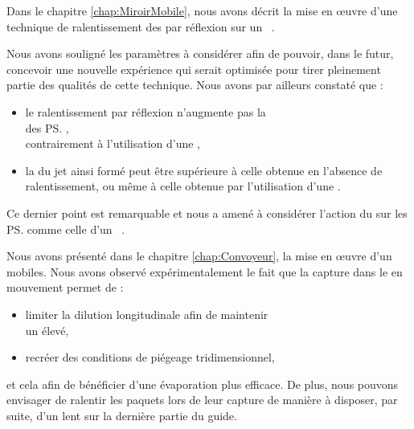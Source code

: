 \vspace{1ex}
\vspace{1ex}

Dans le chapitre \ref{chap:MiroirMobile},
nous avons décrit la mise en \oe uvre d'une technique de ralentissement des \pats par réflexion sur un \mimamo~\cite{RWC06}. 

Nous avons souligné les paramètres à considérer afin de pouvoir, dans le futur,  concevoir une nouvelle expérience qui serait optimisée pour tirer pleinement partie des qualités de cette technique. Nous avons par ailleurs constaté que :
\begin{itemize}
	\item le ralentissement par réflexion n'augmente pas la\\ \dispvitlong des \ps,\\ contrairement à l'utilisation d'une \secpent,
	\item la \ddedpup du jet ainsi formé peut être supérieure à celle obtenue en l'absence de ralentissement, ou même à celle obtenue par l'utilisation d'une \secpent.
\end{itemize}
\noindent
Ce dernier point est remarquable et nous a amené à considérer l'action du \mimo sur les \ps comme celle d'un ~\cite{ReG08}.

\vspace{1ex}
\vspace{1ex}

Nous avons présenté dans le chapitre \ref{chap:Convoyeur}, la mise en \oe uvre d'un \tpIP mobiles. 
Nous avons observé expérimentalement le fait que la capture dans le \tp en mouvement permet de :
\begin{itemize}
	\item limiter la dilution longitudinale afin de maintenir\\ un \tcolel élevé,
	\item recréer des conditions de piégeage tridimensionnel, 
\end{itemize} 
et cela afin de bénéficier d'une évaporation plus efficace. De plus, nous pouvons envisager de ralentir les paquets lors de leur capture de manière à disposer, par suite, d'un \jat lent sur la dernière partie du guide.


